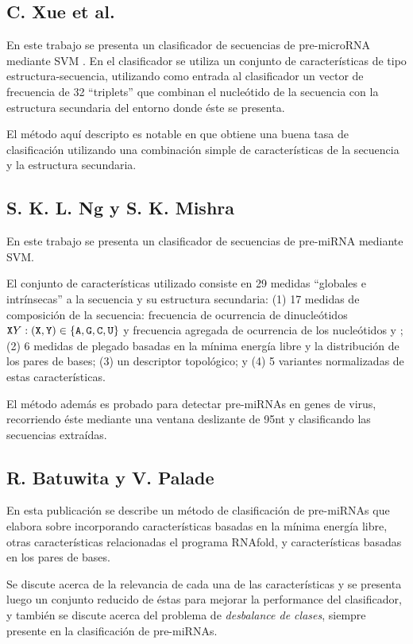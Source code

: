 \documentclass[12pt,bibliography=oldstyle,DIV=12,parskip=half-]{scrreprt}
\begin{document}
\subsection{C. Xue et al. \cite{xue}}
%
En este trabajo se presenta un clasificador de secuencias de
pre-microRNA mediante SVM \cite{svm}.  En el clasificador se utiliza
un conjunto de características de tipo estructura-secuencia,
utilizando como entrada al clasificador un vector de frecuencia de 32
``triplets'' que combinan el nucleótido de la secuencia con la
estructura secundaria del entorno donde éste se presenta.

El método aquí descripto es notable en que obtiene una buena tasa de
clasificación utilizando una combinación simple de características de
la secuencia y la estructura secundaria.
%
\subsection{S. K. L. Ng y S. K. Mishra \cite{ng}}
%
En este trabajo se presenta un clasificador de secuencias de
pre-miRNA mediante SVM.

El conjunto de características utilizado consiste en 29 medidas
``globales e intrínsecas'' a la secuencia y su estructura secundaria:
(1) 17 medidas de composición de la secuencia: frecuencia de
ocurrencia de dinucleótidos
${\texttt XY}:({\texttt X},{\texttt Y})\in\{{\texttt A},{\texttt G},{\texttt C},{\texttt U}\}$
y frecuencia agregada de ocurrencia de los nucleótidos  y
; (2) 6 medidas de plegado basadas en la mínima energía libre
y la distribución de los pares de bases; (3) un descriptor
topológico; y (4) 5 variantes normalizadas de estas características.

El método además es probado para detectar pre-miRNAs en genes de
virus, recorriendo éste mediante una ventana deslizante de 95nt y
clasificando las secuencias extraídas.
%
\subsection{R. Batuwita y V. Palade \cite{batuwita}}
En esta publicación se describe un método de clasificación de
pre-miRNAs que elabora sobre \cite{ng} incorporando características
basadas en la mínima energía libre, otras características relacionadas
el programa RNAfold, y características basadas en los pares de bases.

Se discute acerca de la relevancia de cada una de las características
y se presenta luego un conjunto reducido de éstas para mejorar la
performance del clasificador, y también se discute acerca del problema
de \emph{desbalance de clases}, siempre presente en la
clasificación de pre-miRNAs.
%
\end{document}
